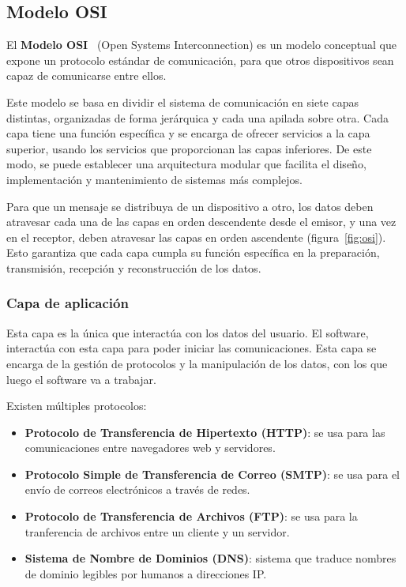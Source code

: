 \subsection{Modelo OSI}
\label{subsec:OSI}
El \textbf{Modelo OSI}~\cite{modelo_osi} (Open Systems Interconnection) es un modelo conceptual que expone un protocolo estándar de comunicación, para que otros dispositivos sean capaz de comunicarse entre ellos. 

Este modelo se basa en dividir el sistema de comunicación en siete capas distintas, organizadas de forma jerárquica y cada una apilada sobre otra. Cada capa tiene una función específica y se encarga de ofrecer servicios a la capa superior, usando los servicios que proporcionan las capas inferiores. De este modo, se puede establecer una arquitectura modular que facilita el diseño, implementación y mantenimiento de sistemas más complejos.


Para que un mensaje se distribuya de un dispositivo a otro, los datos deben atravesar cada una de las capas en orden descendente desde el emisor, y una vez en el receptor, deben atravesar las capas en orden ascendente (figura~\ref{fig:osi}). Esto garantiza que cada capa cumpla su función específica en la preparación, transmisión, recepción y reconstrucción de los datos.

\subsubsection{Capa de aplicación}
\label{subsubsec:CapaAplicacion}
Esta capa es la única que interactúa con los datos del usuario. El software, interactúa con esta capa para poder iniciar las comunicaciones. Esta capa se encarga de la gestión de protocolos y la manipulación de los datos, con los que luego el software va a trabajar.

Existen múltiples protocolos:
\begin{itemize}
    \item \textbf{Protocolo de Transferencia de Hipertexto (HTTP)}: se usa para las comunicaciones entre navegadores web y servidores.
    \item \textbf{Protocolo Simple de Transferencia de Correo (SMTP)}: se usa para el envío de correos electrónicos a través de redes.
    \item \textbf{Protocolo de Transferencia de Archivos (FTP)}: se usa para la tranferencia de archivos entre un cliente y un servidor.
    \item \textbf{Sistema de Nombre de Dominios (DNS)}: sistema que traduce nombres de dominio legibles por humanos a direcciones IP.
\end{itemize}

